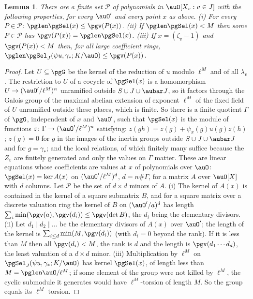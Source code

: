 \documentclass[10pt]{amsart}
\newtheorem{lemma}[theorem]{Lemma}
\theoremstyle{definition}
\theoremstyle{remark}
\begin{document}
\begin{lemma}\label{pg:minor}
There are a finite set $\mathcal P$ of polynomials in $\auO[X_v:v\in J]$ with the following
properties, for every $\auO'$ and every point $x$ as above. {\rm(i)} For every $P\in\mathcal P$:
$\pglen\pgSel(x)\le\pgv(P(x))$. {\rm(ii)} If $\pglen\pgSel(x)<M$ then some $P\in\mathcal P$ has
$\pgv(P(x))=\pglen\pgSel(x)$. {\rm(iii)} If $x=(\zeta_v-1)$ and $\pgv(P(x))<M$ then, for all large
coefficient rings, $\pglen\pgSel_J(\psi u,\gamma_*;K/\auO)\le\pgv(P(x))$.
\end{lemma}
\begin{proof}
Let $U\subseteq\pgG$ be the kernel of the reduction of $u$ modulo $\ell^M$ and of all $\lambda_v$.
The restriction to $U$ of a cocycle of $\pgSel(x)$ is a homomorphism $U\to(\auO'/\ell^M)^n$
unramified outside $S\cup J\cup\aubar J$, so it factors through the Galois group of the maximal
abelian extension of exponent $\ell^M$ of the fixed field of $U$ unramified outside these places,
which is finite. So there is a finite quotient $\Gamma$ of $\pgG$, independent of $x$ and
$\auO'$, such that $\pgSel(x)$ is the module of functions $z\colon\Gamma\to(\auO'/\ell^M)^n$
satisfying: $z(gh)=z(g)+\psi_x(g)u(g)z(h)$; $z(g)=0$ for $g$ in the images of the inertia groups
outside $S\cup J\cup\aubar J$ and for $g=\gamma_*$; and the local relations, of which finitely
many suffice because the $Z_v$ are finitely generated and only the values on $\Gamma$ matter. These
are linear equations whose coefficients are values at $x$ of polynomials over $\auO$: $\pgSel(x)=
\ker A(x)$ on $(\auO'/\ell^M)^{d}$, $d=n\#\Gamma$, for a matrix $A$ over $\auO[X]$ with $d$
columns. Let $\mathcal P$ be the set of $d\times d$ minors of $A$. (i) The kernel of $A(x)$ is
contained in the kernel of a square submatrix $B$, and for a square matrix over a discrete
valuation ring the kernel of $B$ on $(\auO'/a)^d$ has length $\sum_i\min(\pgv(a),\pgv(d_i))\le
\pgv(\det B)$, the $d_i$ being the elementary divisors. (ii) Let $d_1\mid d_2\mid\dots$ be the
elementary divisors of $A(x)$ over $\auO'$; the length of the kernel is
$\sum_{i\le d}\min(M,\pgv(d_i))$ (with $d_i=0$ beyond the rank). If it is less than $M$ then all
$\pgv(d_i)<M$, the rank is $d$ and the length is $\pgv(d_1\cdots d_d)$, the least valuation of a
$d\times d$ minor. (iii) Multiplication by $\ell^M$ on $\pgSel_J(\psi u,\gamma_*;K/\auO)$ has
kernel $\pgSel(x)$, of length less than $M=\pglen\auO/\ell^M$; if some element of the group were not killed by $\ell^M$, the cyclic submodule it
generates would have $\ell^M$-torsion of length $M$. So the group equals its $\ell^M$-torsion.
\end{proof}
\end{document}
